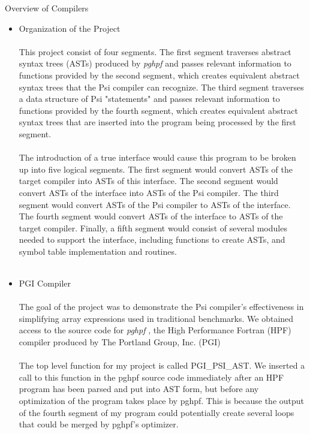Overview of Compilers

\begin{itemize} 
\item Organization of the Project \\ \\

This project consist of four segments.  The first segment traverses abstract
syntax trees (ASTs) produced by {\em pghpf }  and passes relevant information to
functions provided by the second segment, which creates equivalent abstract
syntax trees that the Psi compiler can recognize.  The third segment
traverses a data structure of Psi "statements" and passes relevant information
to functions provided by the fourth segment, which creates equivalent
abstract syntax trees that are inserted into the program being processed
by the first segment.  \\ \\

The introduction of a true interface would cause this program to be broken
up into five logical segments.  The first segment would convert ASTs of the
target compiler into ASTs of this interface.  The second segment would
convert ASTs of the interface into ASTs of the Psi compiler.  The third
segment would convert ASTs of the Psi compiler to ASTs of the interface.  The
fourth segment would convert ASTs of the interface to ASTs of the target
compiler.  Finally, a fifth segment would consist of several modules needed
to support the interface, including functions to create ASTs, and symbol
table implementation and routines.\\ \\

\item PGI Compiler\\ \\

  The goal of the project was to demonstrate the Psi compiler's effectiveness
  in simplifying array expressions used in traditional benchmarks.  We
  obtained access to the source code for {\em pghpf } , the High Performance
  Fortran (HPF) compiler produced by The Portland Group, Inc. (PGI)\\ \\

  The top level function for my project is called PGI_PSI_AST.  We inserted
  a call to this function in the pghpf source code immediately after an
  HPF program has been parsed and put into AST form, but before any
  optimization of the program takes place by pghpf.  This is because the
  output of the fourth segment of my program could potentially create
  several loops that could be merged by pghpf's optimizer.\\ \\


\end{itemize}
